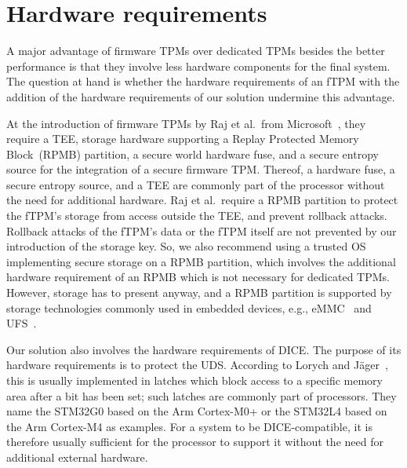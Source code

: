 \section{Hardware requirements}

A major advantage of firmware TPMs over dedicated TPMs besides the better performance is that they involve less hardware components for the final system.
The question at hand is whether the hardware requirements of an fTPM with the addition of the hardware requirements of our solution undermine this advantage.

At the introduction of firmware TPMs by Raj et al.\ from Microsoft~\cite{Raj2015}, they require a TEE, storage hardware supporting a Replay Protected Memory Block~(RPMB) partition, a secure world hardware fuse, and a secure entropy source for the integration of a secure firmware TPM\@.
Thereof, a hardware fuse, a secure entropy source, and a TEE are commonly part of the processor without the need for additional hardware.
Raj et al.\ require a RPMB partition to protect the fTPM's storage from access outside the TEE, and prevent rollback attacks.
Rollback attacks of the fTPM's data or the fTPM itself are not prevented by our introduction of the storage key.
So, we also recommend using a trusted OS implementing secure storage on a RPMB partition, which involves the additional hardware requirement of an RPMB which is not necessary for dedicated TPMs.
However, storage has to present anyway, and a RPMB partition is supported  by storage technologies commonly used in embedded devices, e.g., eMMC~\cite{eMMC} and UFS~\cite{UFS}.




Our solution also involves the hardware requirements of DICE\@.
The purpose of its hardware requirements is to protect the UDS\@.
According to Lorych and Jäger~\cite{Lorych2022}, this is usually implemented in latches which block access to a specific memory area after a bit has been set; such latches are commonly part of processors.
They name the STM32G0 based on the Arm Cortex-M0+ or the STM32L4 based on the Arm Cortex-M4 as examples.
For a system to be DICE-compatible, it is therefore usually sufficient for the processor to support it without the need for additional external hardware.

